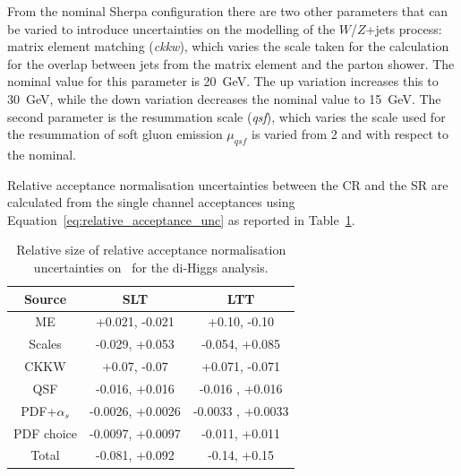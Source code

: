 
From the nominal Sherpa configuration there are two other parameters 
that can be varied to introduce uncertainties 
on the modelling of the $W$/$Z$+jets process: 
matrix element matching (\textit{ckkw}), which varies the scale taken 
for the calculation for the overlap between jets 
from the matrix element and the parton shower. 
The nominal value for this parameter is 20~GeV. 
The up variation increases this to 30~GeV, 
while the down variation decreases the nominal value to 15~GeV. 
The second parameter is the resummation scale (\textit{qsf}), 
which varies the scale used for the resummation 
of soft gluon emission $\mu_{qsf}$ is varied from 2 and with respect to the nominal. 

Relative acceptance normalisation uncertainties between the CR and the SR are calculated 
from the single channel acceptances using Equation~\ref{eq:relative_acceptance_unc} 
as reported in Table~\ref{sec:systs:tab:systematics_normalisations_ZHF}.


\begin{table}
\centering
\small
\begin{tabular}{|c|c|c|}
\hline
Source & SLT & LTT\\
\hline
ME & +0.021, -0.021 & +0.10, -0.10 \\
Scales & -0.029, +0.053 & -0.054, +0.085 \\
CKKW & +0.07, -0.07 &  +0.071, -0.071 \\
QSF & -0.016, +0.016 & -0.016 , +0.016 \\
PDF+$\alpha_s$ & -0.0026, +0.0026 & -0.0033 , +0.0033 \\
PDF choice & -0.0097, +0.0097 & -0.011, +0.011 \\
Total & -0.081, +0.092 & -0.14, +0.15 \\
\hline
\end{tabular}
\caption{Relative size of relative acceptance normalisation uncertainties on \ZHF\ for the di-Higgs analysis.}
\label{sec:systs:tab:systematics_normalisations_ZHF}
\end{table}




